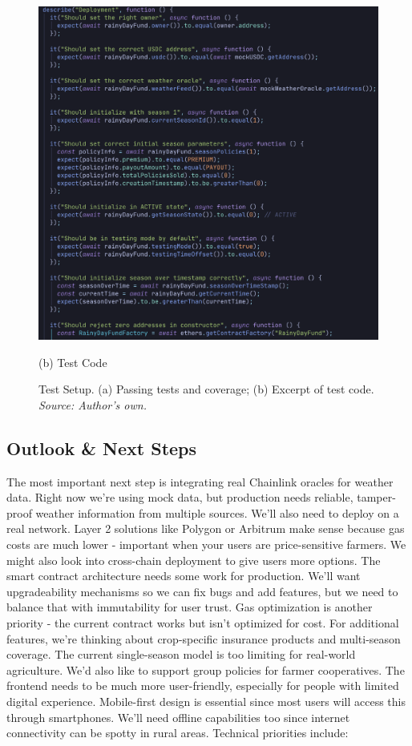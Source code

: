 \documentclass[11pt,a4paper]{article}
\begin{document}
\begin{figure}[H]
\begin{minipage}[b]{0.48\textwidth}
			\includegraphics[width=0.95\linewidth]{graphics/Test_Code}
			\caption*{(b) Test Code}
		\end{minipage}
		\caption{Test Setup. (a) Passing tests and coverage; (b) Excerpt of test code. \\ \textit{Source: Author's own.}}
		\label{fig:test-set-up}
	\end{figure}

	\subsection{Outlook \& Next Steps}\label{subsec:outlook}
	The most important next step is integrating real Chainlink oracles for weather data.
	Right now we're using mock data, but production needs reliable, tamper-proof weather information from multiple sources.
	We'll also need to deploy on a real network.
	Layer 2 solutions like Polygon or Arbitrum make sense because gas costs are much lower - important when your users are price-sensitive farmers.
	We might also look into cross-chain deployment to give users more options.
	The smart contract architecture needs some work for production.
	We'll want upgradeability mechanisms so we can fix bugs and add features, but we need to balance that with immutability for user trust.
	Gas optimization is another priority - the current contract works but isn't optimized for cost.
	For additional features, we're thinking about crop-specific insurance products and multi-season coverage.
	The current single-season model is too limiting for real-world agriculture.
	We'd also like to support group policies for farmer cooperatives.
	The frontend needs to be much more user-friendly, especially for people with limited digital experience.
	Mobile-first design is essential since most users will access this through smartphones.
	We'll need offline capabilities too since internet connectivity can be spotty in rural areas.
	Technical priorities include:
\end{document}
